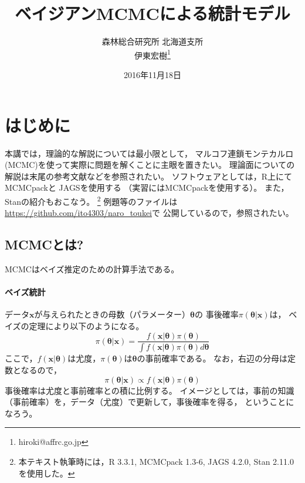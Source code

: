\documentclass[11pt,uplatex]{jsarticle}
\begin{document}
\title{ベイジアンMCMCによる統計モデル}
\author{森林総合研究所 北海道支所\\伊東宏樹\footnote{hiroki@affrc.go.jp}}
\date{2016年11月18日}
\maketitle


\section{はじめに}

本講では，理論的な解説については最小限として，
マルコフ連鎖モンテカルロ(MCMC)を使って実際に問題を解くことに主眼を置きたい。
理論面についての解説は末尾の参考文献などを参照されたい。
ソフトウェアとしては，\textsf{R}\cite{R}上にて
\textsf{MCMCpack}\cite{MCMCpack}と
\textsf{JAGS}\cite{JAGS}を使用する
（実習には\textsf{MCMCpack}を使用する）。
また，\textsf{Stan}\cite{Stan}の紹介もおこなう。
\footnote{本テキスト執筆時には，R 3.3.1, MCMCpack 1.3-6, JAGS 4.2.0, Stan 2.11.0を使用した。}
例題等のファイルは\url{https://github.com/ito4303/naro_toukei}で
公開しているので，参照されたい。

\subsection{MCMCとは?}

MCMCはベイズ推定のための計算手法である。

\paragraph{ベイズ統計}

データ$\bm{x}$が与えられたときの母数（パラメーター）$\bm{\theta}$の
事後確率$\pi(\bm{\theta}|\bm{x})$は，
ベイズの定理により以下のようになる。
\begin{equation}
\pi(\bm{\theta}|\bm{x}) = \frac{f(\bm{x}|\bm{\theta})\pi(\bm{\theta})}
{\int{f(\bm{x}|\bm{\theta})\pi(\bm{\theta})d\bm{\theta}}}\label{bayes1}
\end{equation}
ここで，$f(\bm{x}|\bm{\theta})$は尤度，$\pi(\bm{\theta})$は$\bm{\theta}$の事前確率である。
なお，右辺の分母は定数となるので，
\begin{equation}
\pi(\bm{\theta}|\bm{x}) \propto f(\bm{x}|\bm{\theta})\pi(\bm{\theta})\label{bayes2}
\end{equation}
事後確率は尤度と事前確率との積に比例する。
イメージとしては，事前の知識（事前確率）を，データ（尤度）で更新して，事後確率を得る，
ということになろう。
\end{document}
